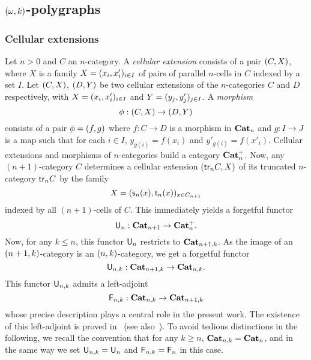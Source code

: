  \subsection{$(\omega,k)$-polygraphs}\label{subsec:okpol}
 \subsubsection{Cellular extensions}\label{ssubsec:cellext}
 Let $n>0$ and $C$ an $n$-category. A {\em cellular extension} consists of a pair $(C,X)$, where $X$ is a  family $X=(x_i,x'_i)_{i\in I}$ of pairs of parallel $n$-cells in $C$ indexed by a set $I$. Let $(C,X)$, $(D,Y)$ be two cellular extensions of the $n$-categories $C$ and $D$ respectively, with $X=(x_i,x'_i)_{i\in I}$ and $Y=(y_j,y'_j)_{j\in I}$. A {\em morphism}
 \[\phi:(C,X)\to(D,Y)\]
 consists of a pair $\phi=(f,g)$ where $f:C\to D$ is a morphism in $\mathbf{Cat}_{n}$ and $g:I\to J$ is a map such that for each $i\in I$, $y_{g(i)}=f(x_i)$ and $y'_{g(i)}=f(x'_i)$. Cellular extensions and morphisms of $n$-categories build a category $\mathbf{Cat}_{n}^{+}$. Now, any $(n{+}1)$-category $C$ determines a cellular extension $(\mathsf{tr}_{n} C,X)$ of its truncated $n$-category $\mathsf{tr}_{n} C$ by the family
 \[X=(\mathsf{s}_{n}(x),\mathsf{t}_{n}(x))_{x\in C_{n+1}}\]
 indexed by all $(n{+}1)$-cells of $C$. This immediately yields a forgetful functor
 \[\mathsf{U}_{n}:\mathbf{Cat}_{n+1}\to \mathbf{Cat}_{n}^{+}.\]
Now, for any $k\leq n$, this functor $\mathsf{U}_{n}$ restricts to
$\mathbf{Cat}_{n+1,k}$. As the image of an $(n+1,k)$-category is an
$(n,k)$-category, we get a forgetful functor
\[\mathsf{U}_{n,k}:\mathbf{Cat}_{n+1,k}\to \mathbf{Cat}_{n,k}.\]
This functor $\mathsf{U}_{n,k}$ admits a left-adjoint
\[\mathsf{F}_{n,k}:\mathbf{Cat}_{n,k}\to \mathbf{Cat}_{n+1,k}\]
whose precise description plays a central role in the present
work. The existence of this left-adjoint is proved
in~\cite{batanin:comfmg} (see also~\cite[Ch.18]{abgmmm:polybk}). To
avoid tedious distinctions in the following, we recall the convention that
for any $k\geq n$, $\mathbf{Cat}_{n,k}=\mathbf{Cat}_{n}$, and in the same way we set
$\mathsf{U}_{n,k}=\mathsf{U}_{n}$ and $\mathsf{F}_{n,k}=\mathsf{F}_{n}$ in this case.

